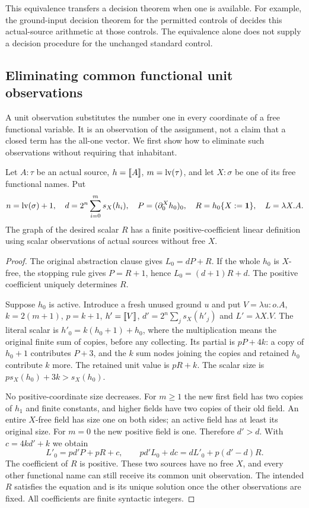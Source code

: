 This equivalence transfers a decision theorem when one is available.
For example, the ground-input decision theorem for the permitted controls
of \cite{groundcomparison} decides this actual-source arithmetic at those
controls. The equivalence alone does not supply a decision procedure
for the unchanged standard control.


\subsection{Eliminating common functional unit observations}\label{sec:units}

A unit observation substitutes the number one in every coordinate of a free
functional variable.  It is an observation of the assignment, not a claim
that a closed term has the all-one vector.  We first show how to eliminate
such observations without requiring that inhabitant.

\begin{lemma}\label{lem:one-unit}
Let $A:\tau$ be an actual source, $h=\mathopen{[\![}A\mathclose{]\!]}$, $m=\operatorname{lv}(\tau)$, and let
$X:\sigma$ be one of its free functional names.  Put
\[
 n=\operatorname{lv}(\sigma)+1,\quad d=2^n\sum_{i=0}^ms_X(h_i),\quad
 P=(\partial^X_0h_0)_0,\quad R=h_0\{X:=\mathbf1\},\quad L=\lambda X.A.
\]
The graph of the desired scalar $R$ has a finite positive-coefficient linear
definition using scalar observations of actual sources without free $X$.
\end{lemma}
\begin{proof}
The original abstraction clause gives $L_0=dP+R$.  If the whole $h_0$ is
$X$-free, the stopping rule gives $P=R+1$, hence
$L_0=(d+1)R+d$.  The positive coefficient uniquely determines $R$.

Suppose $h_0$ is active.  Introduce a fresh unused ground $u$ and put
$V=\lambda u:o.A$, $k=2(m+1)$, $p=k+1$, $h'=\mathopen{[\![}V\mathclose{]\!]}$,
$d'=2^n\sum_js_X(h'_j)$ and $L'=\lambda X.V$.
The literal scalar is $h'_0=k(h_0+1)+h_0$, where the multiplication means
the original finite sum of copies, before any collecting.  Its partial is
$pP+4k$: a copy of $h_0+1$ contributes $P+3$, and the $k$ sum nodes
joining the copies and retained $h_0$ contribute $k$ more.  The retained
unit value is $pR+k$.  The scalar size is
$ps_X(h_0)+3k>s_X(h_0)$.

No positive-coordinate size decreases.  For $m\ge1$ the new first field
has two copies of $h_1$ and finite constants, and higher fields have two
copies of their old field.  An entire $X$-free field has size one on both
sides; an active field has at least its original size.  For $m=0$ the new
positive field is one.  Therefore $d'>d$.  With $c=4kd'+k$ we obtain
\[
 L'_0=pd'P+pR+c,\qquad
 pd'L_0+dc=dL'_0+p(d'-d)R.
\]
The coefficient of $R$ is positive.  These two sources have no free $X$,
and every other functional name can still receive its common unit observation.
The intended $R$ satisfies the equation and is its unique solution once the
other observations are fixed.  All coefficients are finite syntactic integers.
\end{proof}

